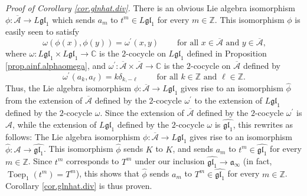 \documentclass[etingof-lie.tex]{subfiles}
\begin{document}
\textit{Proof of Corollary \ref{cor.glnhat.div}.} There is an obvious Lie
algebra isomorphism $\phi:\overline{\mathcal{A}}\rightarrow L\mathfrak{gl}%
_{1}$ which sends $a_{m}$ to $t^{m}\in L\mathfrak{gl}_{1}$ for every
$m\in\mathbb{Z}$. This isomorphism $\phi$ is easily seen to satisfy%
\begin{equation}
\omega\left(  \phi\left(  x\right)  ,\phi\left(  y\right)  \right)
=\omega^{\prime}\left(  x,y\right)  \ \ \ \ \ \ \ \ \ \ \text{for all }%
x\in\overline{\mathcal{A}}\text{ and }y\in\overline{\mathcal{A}}\text{,}
\label{pf.glinhat.div.1}%
\end{equation}
where $\omega:L\mathfrak{gl}_{1}\times L\mathfrak{gl}_{1}\rightarrow
\mathbb{C}$ is the $2$-cocycle on $L\mathfrak{gl}_{1}$ defined in Proposition
\ref{prop.ainf.alphaomega}, and $\omega^{\prime}:\overline{\mathcal{A}}%
\times\overline{\mathcal{A}}\rightarrow\mathbb{C}$ is the $2$-cocycle on
$\overline{\mathcal{A}}$ defined by%
\[
\omega^{\prime}\left(  a_{k},a_{\ell}\right)  =k\delta_{k,-\ell}%
\ \ \ \ \ \ \ \ \ \ \text{for all }k\in\mathbb{Z}\text{ and }\ell\in
\mathbb{Z}.
\]
Thus, the Lie algebra isomorphism $\phi:\overline{\mathcal{A}}\rightarrow
L\mathfrak{gl}_{1}$ gives rise to an isomorphism $\widehat{\phi}$ from the
extension of $\overline{\mathcal{A}}$ defined by the $2$-cocycle
$\omega^{\prime}$ to the extension of $L\mathfrak{gl}_{1}$ defined by the
$2$-cocycle $\omega$. Since the extension of $\overline{\mathcal{A}}$ defined
by the $2$-cocycle $\omega^{\prime}$ is $\mathcal{A}$, while the extension of
$L\mathfrak{gl}_{1}$ defined by the $2$-cocycle $\omega$ is
$\widehat{\mathfrak{gl}_{1}}$, this rewrites as follows: The Lie algebra
isomorphism $\phi:\overline{\mathcal{A}}\rightarrow L\mathfrak{gl}_{1}$ gives
rise to an isomorphism $\widehat{\phi}:\mathcal{A}\rightarrow
\widehat{\mathfrak{gl}_{1}}$. This isomorphism $\widehat{\phi}$ sends $K$ to
$K$, and sends $a_{m}$ to $t^{m}\in\widehat{\mathfrak{gl}_{1}}$ for every
$m\in\mathbb{Z}$. Since $t^{m}$ corresponds to $T^{m}$ under our inclusion
$\widehat{\mathfrak{gl}_{1}}\rightarrow\mathfrak{a}_{\infty}$ (in fact,
$\operatorname*{Toep}\nolimits_{1}\left(  t^{m}\right)  =T^{m}$), this shows
that $\widehat{\phi}$ sends $a_{m}$ to $T^{m}\in\widehat{\mathfrak{gl}_{1}}$
for every $m\in\mathbb{Z}$. Corollary \ref{cor.glnhat.div} is thus proven.
\end{document}
